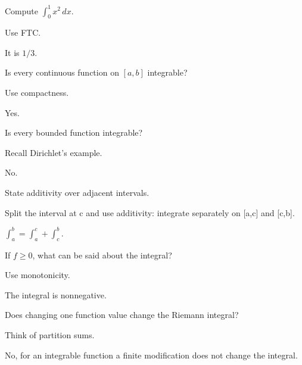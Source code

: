 \begin{exercise}\label{exr:ii10-02}
Compute $\int_0^1x^2\,dx$.
\end{exercise}
\begin{hint}
Use FTC.
\end{hint}
\begin{solution}
It is $1/3$.
\end{solution}

\begin{exercise}\label{exr:ii10-03}
Is every continuous function on $[a,b]$ integrable?
\end{exercise}
\begin{hint}
Use compactness.
\end{hint}
\begin{solution}
Yes.
\end{solution}

\begin{exercise}\label{exr:ii10-04}
Is every bounded function integrable?
\end{exercise}
\begin{hint}
Recall Dirichlet's example.
\end{hint}
\begin{solution}
No.
\end{solution}

\begin{exercise}\label{exr:ii10-05}
State additivity over adjacent intervals.
\end{exercise}
\begin{hint}
Split the interval at c and use additivity: integrate separately on [a,c] and [c,b].
\end{hint}
\begin{solution}
$\int_a^b=\int_a^c+\int_c^b$.
\end{solution}

\begin{exercise}\label{exr:ii10-06}
If $f\ge0$, what can be said about the integral?
\end{exercise}
\begin{hint}
Use monotonicity.
\end{hint}
\begin{solution}
The integral is nonnegative.
\end{solution}

\begin{exercise}\label{exr:ii10-07}
Does changing one function value change the Riemann integral?
\end{exercise}
\begin{hint}
Think of partition sums.
\end{hint}
\begin{solution}
No, for an integrable function a finite modification does not change the integral.
\end{solution}

